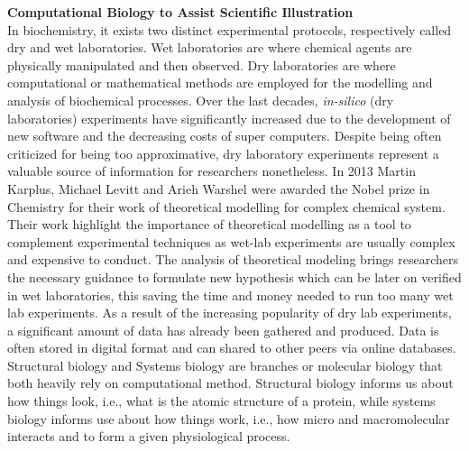 \textbf{Computational Biology to Assist Scientific Illustration}\\
In biochemistry, it exists two distinct experimental protocols, respectively called dry and wet laboratories.
Wet laboratories are where chemical agents are physically manipulated and then observed.
Dry laboratories are where computational or mathematical methods are employed for the modelling and analysis of biochemical processes. 
Over the last decades, \textit{in-silico} (dry laboratories) experiments have significantly increased due to the development of new software and the decreasing costs of super computers.
Despite being often criticized for being too approximative, dry laboratory experiments represent a valuable source of information for researchers nonetheless.
In 2013 Martin Karplus, Michael Levitt and Arieh Warshel were awarded the Nobel prize in Chemistry for their work of theoretical modelling for complex chemical system.
Their work highlight the importance of theoretical modelling as a tool to complement experimental techniques as wet-lab experiments are usually complex and expensive to conduct.
The analysis of theoretical modeling brings researchers the necessary guidance to formulate new hypothesis which can be later on verified in wet laboratories, this saving the time and money needed to run too many wet lab experiments.
As a result of the increasing popularity of dry lab experiments, a significant amount of data has already been gathered and produced.
Data is often stored in digital format and can shared to other peers via online databases.
Structural biology and Systems biology are branches or molecular biology that both heavily rely on computational method.
Structural biology informs us about how things look, i.e., what is the atomic structure of a protein, while systems biology informs use about how things work, i.e., how micro and macromolecular interacts and to form a given physiological process.

%

